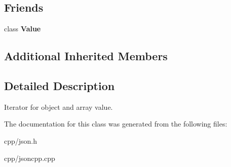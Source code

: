 \subsection*{Friends}
\begin{DoxyCompactItemize}
\item 
\mbox{\label{class_json_1_1_value_iterator_aeceedf6e1a7d48a588516ce2b1983d6f}} 
class {\bfseries Value}
\end{DoxyCompactItemize}
\subsection*{Additional Inherited Members}


\subsection{Detailed Description}
Iterator for object and array value. 

The documentation for this class was generated from the following files\+:\begin{DoxyCompactItemize}
\item 
cpp/json.\+h\item 
cpp/jsoncpp.\+cpp\end{DoxyCompactItemize}
